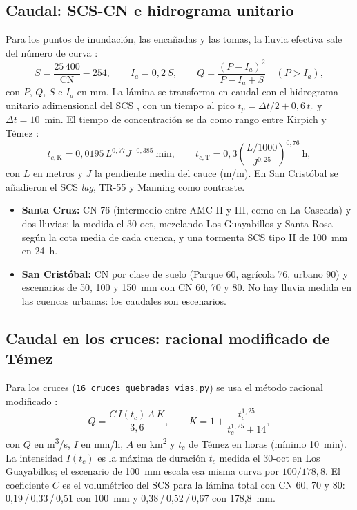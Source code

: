 \documentclass{sosg-informe}
\newcommand{\kmc}{km\textsuperscript{2}}
\newcommand{\mcs}{m\textsuperscript{3}/s}
\begin{document}
\subsection{Caudal: SCS-CN e hidrograma unitario}
Para los puntos de inundación, las encañadas y las tomas, la lluvia efectiva sale del número de curva \citep{usda1986}:
\begin{equation}
  S = \frac{25\,400}{\mathrm{CN}} - 254, \qquad I_a = 0{,}2\,S, \qquad Q = \frac{(P - I_a)^2}{P - I_a + S} \quad (P > I_a),
\end{equation}
con $P$, $Q$, $S$ e $I_a$ en mm. La lámina se transforma en caudal con el hidrograma unitario adimensional del SCS \citep{nrcs2007}, con un tiempo al pico $t_p = \Delta t/2 + 0{,}6\,t_c$ y $\Delta t = 10$~min. El tiempo de concentración se da como rango entre Kirpich \citep{kirpich1940} y Témez \citep{temez1978}:
\begin{equation}
  t_{c,\mathrm{K}} = 0{,}0195\, L^{0{,}77} J^{-0{,}385}\ \text{min}, \qquad t_{c,\mathrm{T}} = 0{,}3 \left(\frac{L/1000}{J^{0{,}25}}\right)^{0{,}76}\ \text{h},
\end{equation}
con $L$ en metros y $J$ la pendiente media del cauce (m/m). En San Cristóbal se añadieron el SCS \emph{lag}, TR-55 y Manning como contraste.
\begin{itemize}
  \item \textbf{Santa Cruz:} CN 76 (intermedio entre AMC II y III, como en La Cascada) y dos lluvias: la medida el 30-oct, mezclando Los Guayabillos y Santa Rosa según la cota media de cada cuenca, y una tormenta SCS tipo II de 100~mm en 24~h.
  \item \textbf{San Cristóbal:} CN por clase de suelo (Parque 60, agrícola 76, urbano 90) y escenarios de 50, 100 y 150~mm con CN 60, 70 y 80. No hay lluvia medida en las cuencas urbanas: los caudales son escenarios.
\end{itemize}

\subsection{Caudal en los cruces: racional modificado de Témez}
Para los cruces (\texttt{16\_cruces\_quebradas\_vias.py}) se usa el método racional modificado \citep{temez1991,chow1988}:
\begin{equation}
  Q = \frac{C\, I(t_c)\, A\, K}{3{,}6}, \qquad K = 1 + \frac{t_c^{1{,}25}}{t_c^{1{,}25} + 14},
\end{equation}
con $Q$ en \mcs, $I$ en mm/h, $A$ en \kmc{} y $t_c$ de Témez en horas (mínimo 10~min). La intensidad $I(t_c)$ es la máxima de duración $t_c$ medida el 30-oct en Los Guayabillos; el escenario de 100~mm escala esa misma curva por $100/178{,}8$. El coeficiente $C$ es el volumétrico del SCS para la lámina total con CN 60, 70 y 80: 0,19\,/\,0,33\,/\,0,51 con 100~mm y 0,38\,/\,0,52\,/\,0,67 con 178,8~mm.
\end{document}
